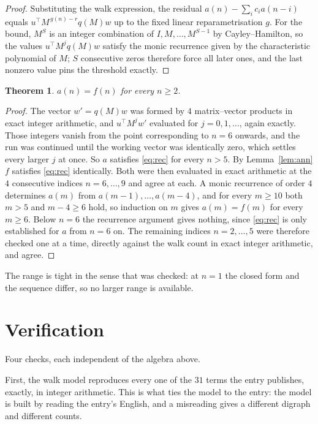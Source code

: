 \documentclass[11pt,a4paper]{article}
\theoremstyle{plain}
\newtheorem{theorem}{Theorem}
\theoremstyle{definition}
\begin{document}
\begin{proof}
Substituting the walk expression, the residual $a(n)-\sum_ic_ia(n-i)$ equals
$u^{\!\top}M^{\,g(n)-r}q(M)w$ up to the fixed linear reparametrisation $g$. For the bound,
$M^{S}$ is an integer combination of $I,M,\dots,M^{S-1}$ by Cayley--Hamilton, so the values
$u^{\!\top}M^{j}q(M)w$ satisfy the monic recurrence given by the characteristic polynomial of
$M$; $S$ consecutive zeros therefore force all later ones, and the last nonzero value pins the
threshold exactly.
\end{proof}

\begin{theorem}
$a(n)=f(n)$ for every $n\ge2$.
\end{theorem}

\begin{proof}
The vector $w'=q(M)w$ was formed by $4$ matrix--vector products in exact integer
arithmetic, and $u^{\!\top}M^{j}w'$ evaluated for $j=0,1,\dots$, again exactly. Those integers
vanish from the point corresponding to $n=6$ onwards, and the run was continued until the
working vector was identically zero, which settles every larger $j$ at once. So $a$ satisfies
\eqref{eq:rec} for every $n>5$. By Lemma~\ref{lem:ann} $f$ satisfies \eqref{eq:rec}
identically. Both were then evaluated in exact arithmetic at the $4$ consecutive indices
$n=6,\dots,9$ and agree at each. A monic recurrence of order $4$
determines $a(m)$ from $a(m-1),\dots,a(m-4)$, and for every $m\ge10$ both
$m>5$ and $m-4\ge6$ hold, so induction on $m$ gives $a(m)=f(m)$ for every
$m\ge6$.
Below $n=6$ the recurrence argument gives nothing, since \eqref{eq:rec} is only
established for $a$ from $n=6$ on. The remaining indices $n=2,\dots,5$ were
therefore checked one at a time, directly against the walk count in exact integer arithmetic,
and agree.
\end{proof}

The range is tight in the sense that was checked: at $n=1$ the closed form and the sequence differ, so no larger range is available.

\section{Verification}

Four checks, each independent of the algebra above.

First, the walk model reproduces every one of the $31$ terms the entry publishes,
exactly, in integer arithmetic. This is what ties the model to the entry: the model is built
by reading the entry's English, and a misreading gives a different digraph and different
counts.
\end{document}
